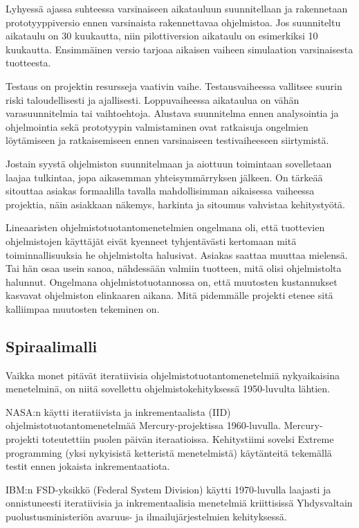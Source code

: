 \documentclass[finnish]{tktltiki2}
\theoremstyle{definition}
\theoremstyle{remark}
\begin{document}
Lyhyessä ajassa suhteessa varsinaiseen aikatauluun suunnitellaan ja rakennetaan prototyyppiversio ennen varsinaista rakennettavaa ohjelmistoa. Jos suunniteltu aikataulu on 30 kuukautta, niin pilottiversion aikataulu on esimerkiksi 10 kuukautta. Ensimmäinen versio tarjoaa aikaisen vaiheen simulaation varsinaisesta tuotteesta\cite{ROY70}.

Testaus on projektin resursseja vaativin vaihe. Testausvaiheessa vallitsee suurin riski taloudellisesti ja ajallisesti. Loppuvaiheessa aikataulua on vähän varasuunnitelmia tai vaihtoehtoja. Alustava suunnitelma ennen analysointia ja ohjelmointia sekä prototyypin valmistaminen ovat ratkaisuja ongelmien löytämiseen ja ratkaisemiseen ennen varsinaiseen testivaiheeseen siirtymistä\cite{ROY70}.

Jostain syystä ohjelmiston suunnitelmaan ja aiottuun toimintaan sovelletaan laajaa tulkintaa, jopa aikasemman yhteisymmärryksen jälkeen. On tärkeää sitouttaa asiakas formaalilla tavalla mahdollisimman aikaisessa vaiheessa projektia, näin asiakkaan näkemys, harkinta ja sitoumus vahvistaa kehitystyötä\cite{ROY70}.

Lineaaristen ohjelmistotuotantomenetelmien ongelmana oli, että tuottevien ohjelmistojen käyttäjät eivät kyenneet tyhjentävästi kertomaan mitä toiminnallisuuksia he ohjelmistolta halusivat. Asiakas saattaa muuttaa mielensä. Tai hän osaa usein sanoa, nähdessään valmiin tuotteen, mitä olisi ohjelmistolta halunnut\cite{BEC99}. Ongelmana ohjelmistotuotannossa on, että muutosten kustannukset kasvavat ohjelmiston elinkaaren aikana. Mitä pidemmälle projekti etenee sitä kalliimpaa muutosten tekeminen on\cite{HIC01}. 	  

\subsection{Spiraalimalli}

Vaikka monet pitävät iteratiivisia ohjelmistotuotantomenetelmiä nykyaikaisina menetelminä, on niitä sovellettu ohjelmistokehityksessä 1950-luvulta lähtien\cite{LAB03}.

NASA:n käytti iteratiivista ja inkrementaalista (IID) ohjelmistotuotantomenetelmää Mercury-projektissa 1960-luvulla. Mercury-projekti toteutettiin puolen päivän iteraatioissa. Kehitystiimi sovelsi Extreme programming (yksi nykyisistä ketteristä menetelmistä) käytänteitä tekemällä testit ennen jokaista inkremen\-taatiota\cite{LAB03}.

IBM:n FSD-yksikkö (Federal System Division) käytti 1970-luvulla laajasti ja onnistuneesti iteratiivisia ja inkrementaalisia menetelmiä kriittisissä Yhdysvaltain puolustusministeriön avaruus- ja ilmailujärjestelmien kehityksessä\cite{LAB03}.
\end{document}
